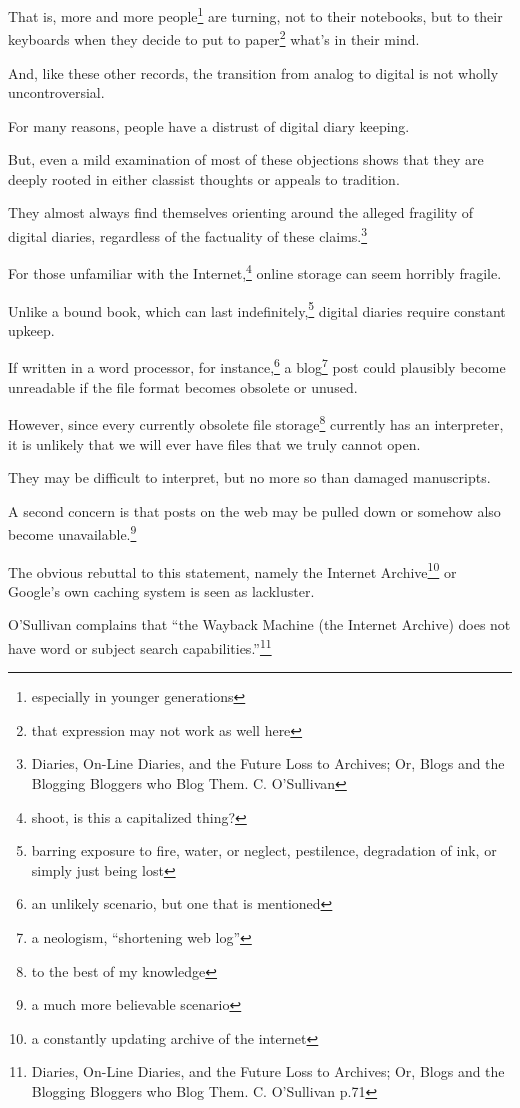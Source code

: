 \documentclass[12pt]{article}[titlepage]
\newcommand{\say}[1]{``#1''}
\newcommand{\1}{\={a}}
\newcommand{\2}{\={e}}
\newcommand{\3}{\={\i}}
\newcommand{\4}{\=o}
\newcommand{\5}{\=u}
\newcommand{\6}{\={A}}
\renewcommand{\,}{\textsuperscript{,}}
\begin{document}
That is, more and more people\footnote{especially in younger generations} are turning, not to their notebooks, but to their keyboards when they decide to put to paper\footnote{that expression may not work as well here} what’s in their mind.

And, like these other records, the transition from analog to digital is not wholly uncontroversial.


For many reasons, people have a distrust of digital diary keeping.

But, even a mild examination of most of these objections shows that they are deeply rooted in either classist thoughts or appeals to tradition.

They almost always find themselves orienting around the alleged fragility of digital diaries, regardless of the factuality of these claims.\footnote{Diaries, On-Line Diaries, and the Future Loss to Archives; Or, Blogs and the Blogging Bloggers who Blog Them. C. O’Sullivan}


For those unfamiliar with the Internet,\footnote{shoot, is this a capitalized thing?} online storage can seem horribly fragile.

Unlike a bound book, which can last indefinitely,\footnote{barring exposure to fire, water, or neglect, pestilence, degradation of ink, or simply just being lost} digital diaries require constant upkeep.

If written in a word processor, for instance,\footnote{an unlikely scenario, but one that is mentioned} a blog\footnote{a neologism, \say{shortening web log}} post could plausibly become unreadable if the file format becomes obsolete or unused.

However, since every currently obsolete file storage\footnote{to the best of my knowledge} currently has an interpreter, it is unlikely that we will ever have files that we truly cannot open.

They may be difficult to interpret, but no more so than damaged manuscripts.


A second concern is that posts on the web may be pulled down or somehow also become unavailable.\footnote{a much more believable scenario}

The obvious rebuttal to this statement, namely the Internet Archive\footnote{a constantly updating archive of the internet} or Google’s own caching system is seen as lackluster.

O’Sullivan complains that \say{the Wayback Machine (the Internet Archive) does not have word or subject search capabilities.}\footnote{Diaries, On-Line Diaries, and the Future Loss to Archives; Or, Blogs and the Blogging Bloggers who Blog Them. C. O’Sullivan p.71}
\end{document}
